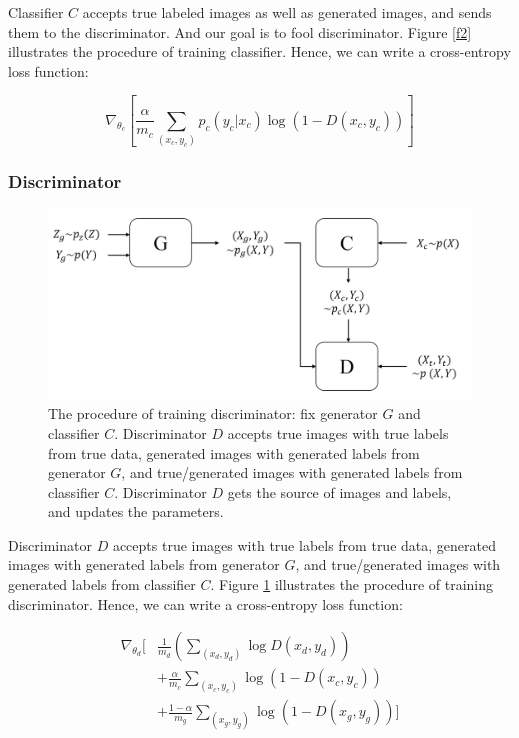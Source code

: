 \documentclass[conference]{IEEEtran}
\begin{document}
Classifier $C$ accepts true labeled images as well as generated images, and sends them to the discriminator. And our goal is to fool discriminator. Figure \ref{f2} illustrates the procedure of training classifier. Hence, we can write a cross-entropy loss function:

\begin{equation}
\nabla_{\theta_c} \left[ \frac{\alpha}{m_c} \sum\limits_{(x_c, y_c)} p_c(y_c|x_c) \log(1 - D(x_c, y_c)) \right]
\label{eq4}
\end{equation}

\subsubsection{Discriminator}

\begin{figure}
\centering
\includegraphics[scale=0.35]{pics/1.png}
\caption{The procedure of training discriminator: fix generator $G$ and classifier $C$. Discriminator $D$ accepts true images with true labels from true data, generated images with generated labels from generator $G$, and true/generated images with generated labels from classifier $C$. Discriminator $D$ gets the source of images and labels, and updates the parameters.}
\label{f1}
\end{figure}

Discriminator $D$ accepts true images with true labels from true data, generated images with generated labels from generator $G$, and true/generated images with generated labels from classifier $C$. Figure \ref{f1} illustrates the procedure of training discriminator. Hence, we can write a cross-entropy loss function:

\begin{equation}
\begin{aligned}
\nabla_{\theta_d} [ & \frac{1}{m_d} (\sum\limits_{(x_d, y_d)} \log D(x_d,y_d)) \\ 
& + \frac{\alpha}{m_c} \sum\limits_{(x_c,y_c)} \log (1 - D(x_c,y_c)) \\
& + \frac{1 - \alpha}{m_g} \sum\limits_{(x_g,y_g)} \log(1-D(x_g,y_g)) ]
\end{aligned}
\label{eq5}
\end{equation}
\end{document}
